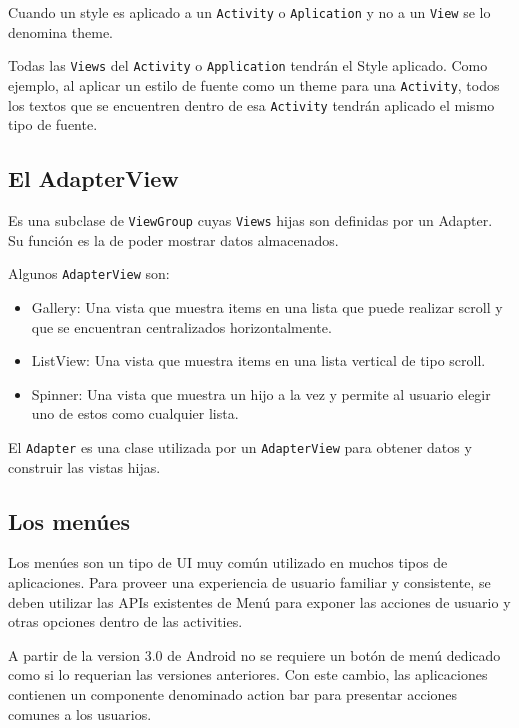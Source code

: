Cuando un style es aplicado a un \texttt{Activity} o \texttt{Aplication} y no a un \texttt{View} se lo denomina theme.

Todas las \texttt{Views} del \texttt{Activity} o \texttt{Application} tendr\'an el Style aplicado. Como ejemplo, al aplicar un estilo de fuente como un theme para una \texttt{Activity}, todos los textos que se encuentren dentro de esa \texttt{Activity} tendr\'an aplicado el mismo tipo de fuente. 

\subsection{El AdapterView}
\label{subsec:dev.adapterView}

Es una subclase de \texttt{ViewGroup} cuyas \texttt{Views} hijas son definidas por un Adapter. Su funci\'on es la de poder mostrar datos almacenados.

Algunos \texttt{AdapterView} son:

\begin{itemize}
\item Gallery: Una vista que muestra items en una lista que puede realizar scroll y que se encuentran centralizados horizontalmente.
\item ListView: Una vista que muestra items en una lista vertical de tipo scroll.
\item Spinner: Una vista que muestra un hijo a la vez y permite al usuario elegir uno de estos como cualquier lista.
\end{itemize}

El \texttt{Adapter} es una clase utilizada por un \texttt{AdapterView} para obtener datos y construir las vistas hijas.

\subsection{Los men\'ues}
\label{subsec:dev.menus}

Los men\'ues son un tipo de \ac{UI} muy com\'un utilizado en muchos tipos de aplicaciones. Para proveer una experiencia de usuario familiar y consistente, se deben utilizar las \ac{API}s existentes de Men\'u para exponer las acciones de usuario y otras opciones dentro de las activities.

A partir de la version 3.0 de Android no se requiere un bot\'on de men\'u dedicado como si lo requerian las versiones anteriores.  Con este cambio, las aplicaciones contienen un componente denominado action bar para presentar acciones comunes a los usuarios.

